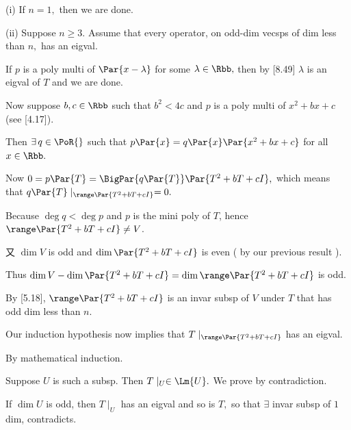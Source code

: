 \par\quad
(i) If $n=1,$ then we are done.\par\quad\Endi
(ii) Suppose $n\geqslant 3.$ Assume that every operator, on odd-dim vecsps of dim less than $n,$ has an eigval.\par\quad\Hii
If $p$ is a poly multi of $\Par{x - \lambda}$ for some $\lambda\in\Rbb,$ then by [8.49] $\lambda$ is an eigval of $T$ and we are done.\par\quad\Hii
Now suppose $b, c\in\Rbb$ such that $b^2 < 4c$ and $p$ is a poly multi of $x^2 + bx + c$ (see [4.17]).\par\quad\Hii
Then $\exists\,q\in\PoR{}$ such that $p\Par{x} = q\Par{x}\Par{x^2 + bx + c}$ for all $x\in\Rbb.$\par\quad\Hii
Now $0 = p\Par{T} = \BigPar{q\Par{T}}\Par{T^2 + bT + cI},$ which means that $q\Par{T}\mid_{\range\Par{T^2+bT+cI}}=0.$\par\quad\Hii
Because $\deg q < \deg p$ and $p$ is the mini poly of $T$, hence $\range\Par{T^2 + bT + cI}\neq V$.\par\quad\Hii
又 $\dim V$ is odd and $\dim\null\Par{T^2 +bT+cI}$ is even ( by our previous result ).\par\quad\Hii
Thus $\dim V - \dim \null\Par{T^2 + bT + cI}=\dim \range\Par{T^2 + bT + cI}$ is odd.\par\quad\Hii
By [5.18], $\range\Par{T^2 + bT + cI}$ is an invar subsp of $V$ under $T$ that has odd dim less than $n.$\par\quad\Hii
Our induction hypothesis now implies that $T\mid_{\range\Par{T^2 + bT + cI}}$ has an eigval.\par\quad
By mathematical induction.\PfEnd
\SepLine

\par\quad
Suppose $U$ is such a subsp. Then $T\mid_U\in\Lm{U}.$
We prove by contradiction.\par\quad
If $\dim U$ is odd, then $T\mid_U$ has an eigval and so is $T,$ so that $\exists$ invar subsp of $1$ dim, contradicts.\PfEnd
\SepLine

